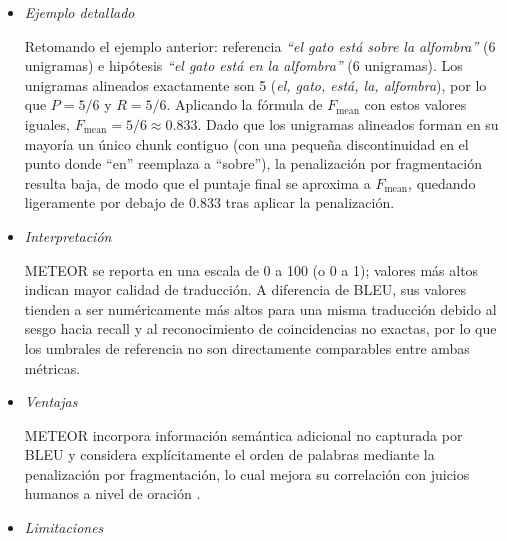 \begin{itemize}
donde $ch$ es el número de \textit{chunks}, $m$ es el número total de unigramas alineados, y $\gamma$, $\beta$ son parámetros ajustables (comúnmente $\gamma = 0.5$, $\beta = 3$) \cite{banerjee2005meteor}. El puntaje final es:

\begin{equation}
\text{METEOR} = F_{\text{mean}} \cdot (1 - \text{Penalty})
\end{equation}


\item \textit{Ejemplo detallado} \\
\vspace{-0.5cm}

Retomando el ejemplo anterior: referencia \textit{``el gato está sobre la alfombra''} (6 unigramas) e hipótesis \textit{``el gato está en la alfombra''} (6 unigramas). Los unigramas alineados exactamente son 5 (\textit{el, gato, está, la, alfombra}), por lo que $P = 5/6$ y $R = 5/6$. Aplicando la fórmula de $F_{\text{mean}}$ con estos valores iguales, $F_{\text{mean}} = 5/6 \approx 0.833$. Dado que los unigramas alineados forman en su mayoría un único chunk contiguo (con una pequeña discontinuidad en el punto donde ``en'' reemplaza a ``sobre''), la penalización por fragmentación resulta baja, de modo que el puntaje final se aproxima a $F_{\text{mean}}$, quedando ligeramente por debajo de 0.833 tras aplicar la penalización.

\item \textit{Interpretación} \\
\vspace{-0.5cm}

METEOR se reporta en una escala de 0 a 100 (o 0 a 1); valores más altos indican mayor calidad de traducción. A diferencia de BLEU, sus valores tienden a ser numéricamente más altos para una misma traducción debido al sesgo hacia recall y al reconocimiento de coincidencias no exactas, por lo que los umbrales de referencia no son directamente comparables entre ambas métricas.

\item \textit{Ventajas} \\
\vspace{-0.5cm}


METEOR incorpora información semántica adicional no capturada por BLEU y considera explícitamente el orden de palabras mediante la penalización por fragmentación, lo cual mejora su correlación con juicios humanos a nivel de oración \cite{lee2023survey}.

\item \textit{Limitaciones} \\
\vspace{-0.5cm}


\end{itemize}
